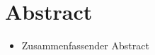 \section{Abstract}
\label{sec:abstract}
\begin{itemize}
	\item{Zusammenfassender Abstract}
\end{itemize}